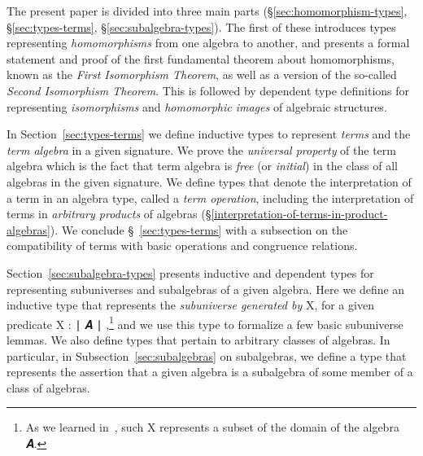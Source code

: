 \documentclass[a4paper,UKenglish,cleveref,autoref,thm-restate,12pt]{../lipics-v2021-wjd}
\begin{document}
The present paper is divided into three main parts (\S\ref{sec:homomorphism-types}, \S\ref{sec:types-terms}, \S\ref{sec:subalgebra-types}).  The first of these introduces types representing \emph{homomorphisms} from one algebra to another, and presents a formal statement and proof of the first fundamental theorem about homomorphisms, known as the \emph{First Isomorphism Theorem}, as well as a version of the so-called \emph{Second Isomorphism Theorem}. This is followed by dependent type definitions for representing \emph{isomorphisms} and \emph{homomorphic images} of algebraic structures.

In Section~\ref{sec:types-terms} we define inductive types to represent \emph{terms} and the \emph{term algebra} in a given signature. We prove the \emph{universal property} of the term algebra which is the fact that term algebra is \emph{free} (or \emph{initial}) in the class of all algebras in the given signature.  We define types that denote the interpretation of a term in an algebra type, called a \emph{term operation}, including the interpretation of terms in \emph{arbitrary products} of algebras (\S\ref{interpretation-of-terms-in-product-algebras}). We conclude \S~\ref{sec:types-terms} with a subsection on the compatibility of terms with basic operations and congruence relations.

Section~\ref{sec:subalgebra-types} presents inductive and dependent types for representing subuniverses and subalgebras of a given algebra. Here we define an inductive type that represents the \emph{subuniverse generated by} \ab X, for a given predicate \ab X \as :  \af ∣ \ab 𝑨 \af ∣ \AgdaUnderscore,\footnote{As we learned in~\cite{DeMeo:2021-1}, such \ab X represents a subset of the domain of the algebra \ab 𝑨.} and we use this type to formalize a few basic subuniverse lemmas.  We also define types that pertain to arbitrary classes of algebras. In particular, in Subsection~\ref{sec:subalgebras} on subalgebras, we define a type that represents the assertion that a given algebra is a subalgebra of some member of a class of algebras.

\newcommand\otherparta{\textit{Part 1: equality, extensionality, truncation, and dependent types for relations and algebras}~\cite{DeMeo:2021-1}.}
\newcommand\otherpartb{\textit{Part 3: free algebras, equational classes, and Birkhoff's theorem}~\cite{DeMeo:2021-3}.}
\end{document}
